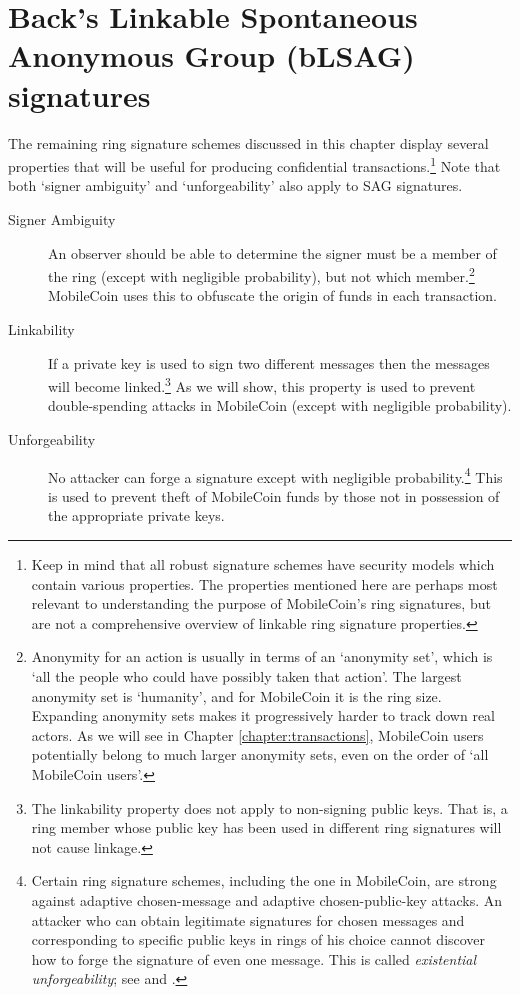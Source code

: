 \section{Back's Linkable Spontaneous Anonymous Group (bLSAG) signatures}
\label{sec:blsag}

The remaining ring signature schemes discussed in this chapter display several properties that will be useful for producing confidential transactions.\footnote{Keep in mind that all robust signature schemes have security models which contain various properties. The properties mentioned here are perhaps most relevant to understanding the purpose of MobileCoin's ring signatures, but are not a comprehensive overview of linkable ring signature properties.} Note that both `signer ambiguity' and `unforgeability' also apply to SAG signatures.

\begin{description}
	\item[Signer Ambiguity]
	An observer should be able to determine the signer must be a member of the ring (except with negligible probability), but not which member.\footnote{\label{anonymity_note}Anonymity for an action is usually in terms of an `anonymity set’, which is `all the people who could have possibly taken that action’. The largest anonymity set is `humanity’, and for MobileCoin it is the ring size. Expanding anonymity sets makes it progressively harder to track down real actors. As we will see in Chapter \ref{chapter:transactions}, MobileCoin users potentially belong to much larger anonymity sets, even on the order of `all MobileCoin users'.} MobileCoin uses this to obfuscate the origin of funds in each transaction.

	\item[Linkability]
	If a private key is used to sign two different messages then the messages will become linked.\footnote{\label{linkability_note}The linkability property does not apply to non-signing public keys. That is, a ring member whose public key has been used in different ring signatures will not cause linkage.} As we will show, this property is used to prevent double-spending attacks in MobileCoin (except with negligible probability).

	\item[Unforgeability]
    No attacker can forge a signature except with negligible probability.\footnote{Certain ring signature schemes, including the one in MobileCoin, are strong against adaptive chosen-message and adaptive chosen-public-key attacks. An attacker who can obtain legitimate signatures for chosen messages and corresponding to specific public keys in rings of his choice cannot discover how to forge the signature of even one message. This is called {\em existential unforgeability}; see \cite{MRL-0005-ringct} and \cite{Liu2004}.} This is used to prevent theft of MobileCoin funds by those not in possession of the appropriate private keys.
\end{description}

